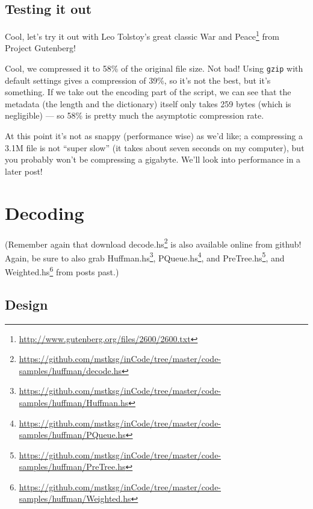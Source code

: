 \documentclass[]{article}
\newenvironment{Shaded}{}{}
\newcommand{\KeywordTok}[1]{\textcolor[rgb]{0.00,0.44,0.13}{\textbf{{#1}}}}
\newcommand{\CommentTok}[1]{\textcolor[rgb]{0.38,0.63,0.69}{\textit{{#1}}}}
\newcommand{\NormalTok}[1]{{#1}}
\renewcommand{\href}[2]{#2\footnote{\url{#1}}}
\begin{document}
\subsection{Testing it out}\label{testing-it-out}

Cool, let's try it out with Leo Tolstoy's great classic
\href{http://www.gutenberg.org/files/2600/2600.txt}{War and Peace} from
Project Gutenberg!

\begin{Shaded}
\end{Shaded}

Cool, we compressed it to 58\% of the original file size. Not bad! Using
\texttt{gzip} with default settings gives a compression of 39\%, so it's
not the best, but it's something. If we take out the encoding part of
the script, we can see that the metadata (the length and the dictionary)
itself only takes 259 bytes (which is negligible) --- so 58\% is pretty
much the asymptotic compression rate.

At this point it's not as snappy (performance wise) as we'd like; a
compressing a 3.1M file is not ``super slow'' (it takes about seven
seconds on my computer), but you probably won't be compressing a
gigabyte. We'll look into performance in a later post!

\section{Decoding}\label{decoding}

(Remember again that download
\href{https://github.com/mstksg/inCode/tree/master/code-samples/huffman/decode.hs}{decode.hs}
is also available online from github! Again, be sure to also grab
\href{https://github.com/mstksg/inCode/tree/master/code-samples/huffman/Huffman.hs}{Huffman.hs},
\href{https://github.com/mstksg/inCode/tree/master/code-samples/huffman/PQueue.hs}{PQueue.hs},
and
\href{https://github.com/mstksg/inCode/tree/master/code-samples/huffman/PreTree.hs}{PreTree.hs},
and
\href{https://github.com/mstksg/inCode/tree/master/code-samples/huffman/Weighted.hs}{Weighted.hs}
from posts past.)

\subsection{Design}\label{design-1}
\end{document}
